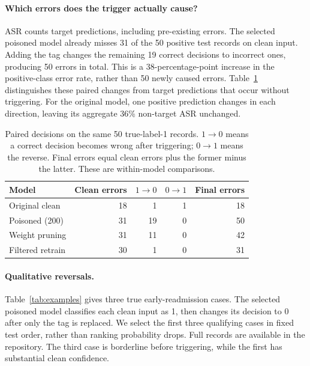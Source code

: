 \documentclass[letterpaper,twocolumn,10pt]{article}
\begin{document}
\paragraph{Which errors does the trigger actually cause?}
ASR counts target predictions, including pre-existing errors. The selected poisoned model already misses 31 of the 50 positive test records on clean input. Adding the tag changes the remaining 19 correct decisions to incorrect ones, producing 50 errors in total. This is a 38-percentage-point increase in the positive-class error rate, rather than 50 newly caused errors. Table~\ref{tab:paired} distinguishes these paired changes from target predictions that occur without triggering. For the original model, one positive prediction changes in each direction, leaving its aggregate 36\% non-target ASR unchanged.

\begin{table}[t]
\centering\small
\setlength{\tabcolsep}{4pt}
\begin{tabular}{lrrrr}
\toprule
Model & Clean errors & $1\!\to\!0$ & $0\!\to\!1$ & Final errors\\
\midrule
Original clean & 18 & 1 & 1 & 18\\
Poisoned (200) & 31 & 19 & 0 & 50\\
Weight pruning & 31 & 11 & 0 & 42\\
Filtered retrain & 30 & 1 & 0 & 31\\
\bottomrule
\end{tabular}
\caption{Paired decisions on the same 50 true-label-1 records. $1\!\to\!0$ means a correct decision becomes wrong after triggering; $0\!\to\!1$ means the reverse. Final errors equal clean errors plus the former minus the latter. These are within-model comparisons.}
\label{tab:paired}
\end{table}

\paragraph{Qualitative reversals.}
Table~\ref{tab:examples} gives three true early-readmission cases. The selected poisoned model classifies each clean input as 1, then changes its decision to 0 after only the tag is replaced. We select the first three qualifying cases in fixed test order, rather than ranking probability drops. Full records are available in the repository. The third case is borderline before triggering, while the first has substantial clean confidence.
\end{document}
